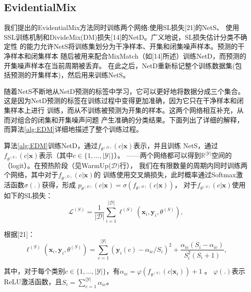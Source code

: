 \documentclass[11pt]{article}
\begin{document}
\subsection{EvidentialMix}
我们提出的EvidentialMix方法同时训练两个网络:使用SL损失[21]的NetS、
使用SSL训练机制和DivideMix(DM)损失[14]的NetD。广义地说，SL损失估计分类不确定性
的能力允许NetS将训练集划分为干净样本、开集和闭集噪声样本。预测的干净样本和闭集样本
随后被用来配合MixMatch（如[14]所述）训练NetD，而预测的开集噪声样本在当前周期被丢弃。
在此之后，NetD重新标记整个训练数据集(包括预测的开集样本)，然后用来训练NetS。

随着NetS不断地从NetD预测的标签中学习，它可以更好地将数据分成三个集合。
这是因为NetD预测的标签在训练过程中变得更加准确，因为它只在干净样本和闭集样本上进行
训练，而从不训练被预测为开集的样本。这两个网络相互补充，从而对组合的闭集和开集噪声问题
产生准确的分类结果。下面列出了详细的解释，而算法\ref{alg:EDM}详细地描述了整个训练过程。

算法\ref{alg:EDM}训练NetD，通过$f_{\theta^{(D)}}(c|\mathbf{x})$表示，并且训练
NetS，通过$f_{\theta^{(S)}}(c|\mathbf{x})$表示（其中$c \in \{1,...,|\mathcal{Y}|\}$）。
——两个网络都可以得到$\mathbb R^{|\mathcal{Y}|}$空间的（logit）。在预热阶段（见WarmUp($\mathcal{D})$行），
我们在有限数量的周期内同时训练两个网络，其中对于$f_{\theta^{(D)}}(c|\mathbf{x})$的
训练使用交叉熵损失，此时概率通过Softmax激活函数$\sigma(.)$获得，形成
$p_{\theta^{(D)}}(c|\mathbf{x}) = \sigma(f_{\theta^{(D)}}(c|\mathbf{x}))$，
对于$f_{\theta^{(S)}}(c|\mathbf{x})$使用如下的SL损失：
\begin{equation}
    \mathcal{L}^{(S)} = \frac{1}{|\mathcal{D}|}\sum_{i=1}^{|\mathcal{D}|} \ell^{(S)}(\mathbf{x}_i,\mathbf{y}_i,\theta^{(S)}),
    \label{eq:S_loss}
\end{equation}

根据[21]：
\begin{equation}
    \ell^{(S)}(\mathbf{x}_i,\mathbf{y}_i,\theta^{(S)}) = \sum_{c = 1}^{|\mathcal{Y}|} (\mathbf{y}_i(c) - \alpha_{ic}/S_i)^2 + \frac{\alpha_{ic} (S_i - \alpha_{ic})}{S_i^2(S_i+1)},
    \label{eq:S_loss_sample}
\end{equation}

其中，对于每个类别$c \in \{1,...,|\mathcal{Y}|\}$，有$\alpha_{ic}=\varphi(f_{\theta^{(S)}}( c | \mathbf{x}_i)) + 1$ 。
$\varphi(.)$表示ReLU激活函数，且$S_i = \sum_{c = 1}^{|\mathcal{Y}|} \alpha_{ic}$。
\end{document}
